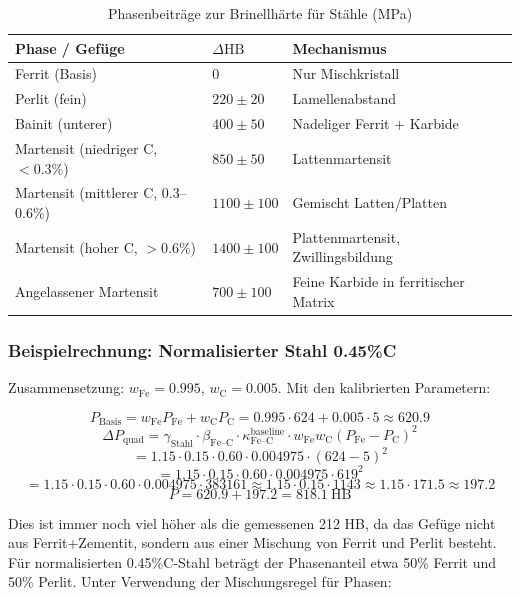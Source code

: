 \documentclass[12pt,a4paper]{article}
\begin{document}
	\begin{longtable}{p{3.5cm} p{3.0cm} p{3.0cm} p{4cm}}
		\caption{Phasenbeiträge zur Brinellhärte für Stähle (MPa)}\label{tab:steel_phase_contrib}\\
		\toprule
		\textbf{Phase / Gefüge} & $\Delta\text{HB}$ & \textbf{Mechanismus} \\
		\midrule
		Ferrit (Basis) & 0 & Nur Mischkristall \\
		Perlit (fein) & $220 \pm 20$ & Lamellenabstand \\
		Bainit (unterer) & $400 \pm 50$ & Nadeliger Ferrit + Karbide \\
		Martensit (niedriger C, $<0.3\%$) & $850 \pm 50$ & Lattenmartensit \\
		Martensit (mittlerer C, 0.3–0.6\%) & $1100 \pm 100$ & Gemischt Latten/Platten \\
		Martensit (hoher C, $>0.6\%$) & $1400 \pm 100$ & Plattenmartensit, Zwillingsbildung \\
		Angelassener Martensit & $700 \pm 100$ & Feine Karbide in ferritischer Matrix \\
		\bottomrule
	\end{longtable}
	
	\subsubsection{Beispielrechnung: Normalisierter Stahl 0.45\%C}
	
	Zusammensetzung: $w_{\text{Fe}} = 0.995$, $w_{\text{C}} = 0.005$. Mit den kalibrierten Parametern:
	
	\[
	P_{\text{Basis}} = w_{\text{Fe}} P_{\text{Fe}} + w_{\text{C}} P_{\text{C}} = 0.995\cdot624 + 0.005\cdot5 \approx 620.9
	\]
	\[
	\Delta P_{\text{quad}} = \gamma_{\text{Stahl}} \cdot \beta_{\text{Fe–C}} \cdot \kappa_{\text{Fe–C}}^{\text{baseline}} \cdot w_{\text{Fe}} w_{\text{C}} (P_{\text{Fe}}-P_{\text{C}})^2
	\]
	\[
	= 1.15 \cdot 0.15 \cdot 0.60 \cdot 0.004975 \cdot (624-5)^2
	\]
	\[
	= 1.15 \cdot 0.15 \cdot 0.60 \cdot 0.004975 \cdot 619^2
	\]
	\[
	= 1.15 \cdot 0.15 \cdot 0.60 \cdot 0.004975 \cdot 383161 \approx 1.15 \cdot 0.15 \cdot 1143 \approx 1.15 \cdot 171.5 \approx 197.2
	\]
	\[
	P = 620.9 + 197.2 = 818.1\ \text{HB}
	\]
	
	Dies ist immer noch viel höher als die gemessenen 212 HB, da das Gefüge nicht aus Ferrit+Zementit, sondern aus einer Mischung von Ferrit und Perlit besteht. Für normalisierten 0.45\%C-Stahl beträgt der Phasenanteil etwa 50\% Ferrit und 50\% Perlit. Unter Verwendung der Mischungsregel für Phasen:
	
\end{document}
